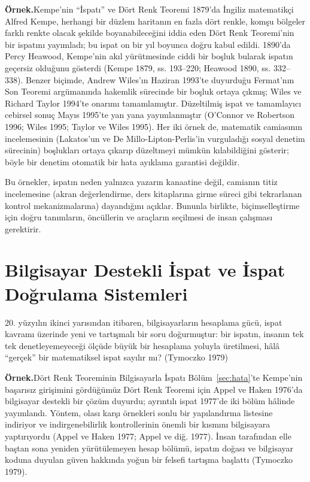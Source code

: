 \begin{tcolorbox}[bookbox,colback=cEx]\textbf{\textsf{\textcolor{cAcc}{Örnek.}}}\quad Kempe’nin “İspatı” ve Dört Renk Teoremi 1879’da İngiliz matematikçi Alfred Kempe, herhangi bir düzlem haritanın en fazla dört renkle, komşu bölgeler farklı renkte olacak şekilde boyanabileceğini iddia eden Dört Renk Teoremi’nin bir ispatını yayımladı; bu ispat on bir yıl boyunca doğru kabul edildi. 1890’da Percy Heawood, Kempe’nin akıl yürütmesinde ciddi bir boşluk bularak ispatın geçersiz olduğunu gösterdi (Kempe 1879, ss. 193–220; Heawood 1890, ss. 332–338). Benzer biçimde, Andrew Wiles’ın Haziran 1993’te duyurduğu Fermat’nın Son Teoremi argümanında hakemlik sürecinde bir boşluk ortaya çıkmış; Wiles ve Richard Taylor 1994’te onarımı tamamlamıştır. Düzeltilmiş ispat ve tamamlayıcı cebirsel sonuç Mayıs 1995’te yan yana yayımlanmıştır (O’Connor ve Robertson 1996; Wiles 1995; Taylor ve Wiles 1995). Her iki örnek de, matematik camiasının incelemesinin (Lakatos’un ve De Millo-Lipton-Perlis’in vurguladığı sosyal denetim sürecinin) boşlukları ortaya çıkarıp düzeltmeyi mümkün kılabildiğini gösterir; böyle bir denetim otomatik bir hata ayıklama garantisi değildir.\end{tcolorbox}

Bu örnekler, ispatın neden yalnızca yazarın kanaatine değil, camianın titiz incelemesine (akran değerlendirme, ders kitaplarına girme süreci gibi tekrarlanan kontrol mekanizmalarına) dayandığını açıklar. Bununla birlikte, biçimselleştirme için doğru tanımların, öncüllerin ve araçların seçilmesi de insan çalışması gerektirir.

\section{Bilgisayar Destekli İspat ve İspat Doğrulama Sistemleri}\label{sec:bilgisayar}

20. yüzyılın ikinci yarısından itibaren, bilgisayarların hesaplama gücü, ispat kavramı üzerinde yeni ve tartışmalı bir soru doğurmuştur: bir ispatın, insanın tek tek denetleyemeyeceği ölçüde büyük bir hesaplama yoluyla üretilmesi, hâlâ “gerçek” bir matematiksel ispat sayılır mı? (Tymoczko 1979)

\begin{tcolorbox}[bookbox,colback=cEx]\textbf{\textsf{\textcolor{cAcc}{Örnek.}}}\quad Dört Renk Teoreminin Bilgisayarla İspatı Bölüm~\ref{sec:hata}’te Kempe’nin başarısız girişimini gördüğümüz Dört Renk Teoremi için Appel ve Haken 1976’da bilgisayar destekli bir çözüm duyurdu; ayrıntılı ispat 1977’de iki bölüm hâlinde yayımlandı. Yöntem, olası karşı örnekleri sonlu bir yapılandırma listesine indiriyor ve indirgenebilirlik kontrollerinin önemli bir kısmını bilgisayara yaptırıyordu (Appel ve Haken 1977; Appel ve diğ. 1977). İnsan tarafından elle baştan sona yeniden yürütülemeyen hesap bölümü, ispatın doğası ve bilgisayar koduna duyulan güven hakkında yoğun bir felsefi tartışma başlattı (Tymoczko 1979).\end{tcolorbox}

